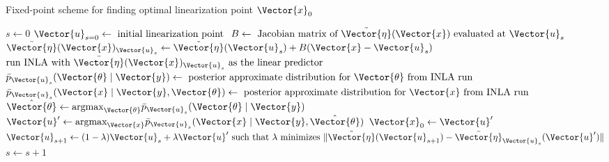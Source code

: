 \begin{algorithm}[h!]
    \caption{Fixed-point scheme for finding optimal linearization point $\Vector{x}_0$}
    \label{alg:inlabru-fpi}
    \begin{algorithmic}
    \State $s \gets 0$
    \State $\Vector{u}_{s = 0} \gets \text{ initial linearization point }$
        \State $B \gets \text{ Jacobian matrix of } \tilde{\Vector{\eta}}(\Vector{x}) \text{ evaluated at } \Vector{u}_s$
        \State $ \bar{\Vector{\eta}}(\Vector{x})_{\Vector{u}_s} \gets \tilde{\Vector{\eta}}(\Vector{u}_s) + B(\Vector{x} - \Vector{u}_s)$
        \State $\text{run INLA with }\bar{\Vector{\eta}}(\Vector{x})_{\Vector{u}_s} \text{ as the linear predictor}$
        \State $\bar{p}_{\Vector{u}_s}(\Vector{\theta}\mid \Vector{y}) \gets \text{ posterior approximate distribution for $\Vector{\theta}$ from INLA run}$
        \State $\bar{p}_{\Vector{u}_s}(\Vector{x}\mid \Vector{y}, \Vector{\theta}) \gets \text{ posterior approximate distribution for $\Vector{x}$ from INLA run}$
        \State $\hat{\Vector{\theta}} \gets \text{argmax}_{\Vector{\theta}} \bar{p}_{\Vector{u}_s}(\Vector{\theta}\mid \Vector{y}) $
        \State $\Vector{u}' \gets \text{argmax}_{\Vector{x}} \bar{p}_{\Vector{u}_s}(\Vector{x}\mid \Vector{y}, \hat{\Vector{\theta}})$
            \State $\Vector{x}_0 \gets \Vector{u}'$
            \State {}
        \Else
            \State $\Vector{u}_{s+1} \gets (1 - \lambda)\Vector{u}_s + \lambda \Vector{u}' \text{ such that } \lambda \text{ minimizes } \lVert \tilde{\Vector{\eta}}(\Vector{u}_{s+1}) - \bar{\Vector{\eta}}_{\Vector{u}_s}(\Vector{u}') \rVert$
            \State $s \gets s + 1$
        \EndIf
    \EndWhile
    \end{algorithmic}
\end{algorithm}




